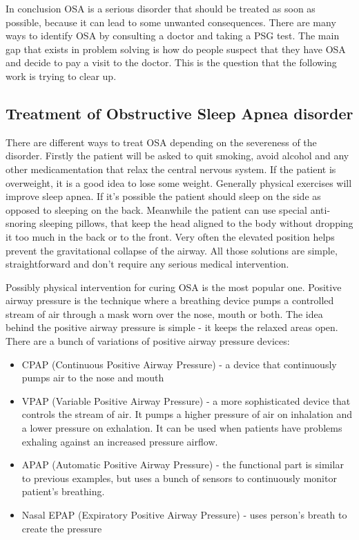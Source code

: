 \documentclass[12pt,a4paper]{report}
\begin{document}
In conclusion OSA is a serious disorder that should be treated as soon as possible, because it can lead to some unwanted consequences. There are many ways to identify OSA by consulting a doctor and taking a PSG test. The main gap that exists in problem solving is how do people suspect that they have OSA and decide to pay a visit to the doctor. This is the question that the following work is trying to clear up.

\subsection{Treatment of Obstructive Sleep Apnea disorder}
There are different ways to treat OSA depending on the severeness of the disorder. Firstly the patient will be asked to quit smoking, avoid alcohol and any other medicamentation that relax the central nervous system. If the patient is overweight, it is a good idea to lose some weight. Generally physical exercises will improve sleep apnea. If it's possible the patient should sleep on the side as opposed to sleeping on the back. Meanwhile the patient can use special anti-snoring sleeping pillows, that keep the head aligned to the body without dropping it too much in the back or to the front. Very often the elevated position helps prevent the gravitational collapse of the airway. All those solutions are simple, straightforward and don't require any serious medical intervention.

Possibly physical intervention for curing OSA is the most popular one. Positive airway pressure is the technique where a breathing device pumps a controlled stream of air through a mask worn over the nose, mouth or both. The idea behind the positive airway pressure is simple - it keeps the relaxed areas open.  There are a bunch of variations of positive airway pressure devices:
\begin{itemize}
 \item CPAP (Continuous Positive Airway Pressure) - a device that continuously pumps air to the nose and mouth
 \item VPAP (Variable Positive Airway Pressure) - a more sophisticated device that controls the stream of air. It pumps a higher pressure of air on inhalation and a lower pressure on exhalation. It can be used when patients have problems exhaling against an increased pressure airflow.
 \item APAP (Automatic Positive Airway Pressure) - the functional part is similar to previous examples, but uses a bunch of sensors to continuously monitor patient's breathing.
 \item Nasal EPAP (Expiratory Positive Airway Pressure) - uses person's breath to create the pressure
\end{itemize}
\end{document}
